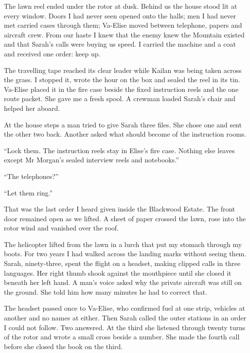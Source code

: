 The lawn reel ended under the rotor at dusk. Behind us the house stood lit at every window. Doors I had never seen opened onto the halls; men I had never met carried cases through them; Va-Elise moved between telephone, papers and aircraft crew. From our haste I knew that the enemy knew the Mountain existed and that Sarah's calls were buying us speed. I carried the machine and a coat and received one order: keep up.\par

The travelling tape reached its clear leader while Kailan was being taken across the grass. I stopped it, wrote the hour on the box and sealed the reel in its tin. Va-Elise placed it in the fire case beside the fixed instruction reels and the one route packet. She gave me a fresh spool. A crewman loaded Sarah's chair and helped her aboard.\par

At the house steps a man tried to give Sarah three files. She chose one and sent the other two back. Another asked what should become of the instruction rooms.\par

``Lock them. The instruction reels stay in Elise's fire case. Nothing else leaves except Mr Morgan's sealed interview reels and notebooks.''\par

``The telephones?''\par

``Let them ring.''\par

That was the last order I heard given inside the Blackwood Estate. The front door remained open as we lifted. A sheet of paper crossed the lawn, rose into the rotor wind and vanished over the roof.\par

The helicopter lifted from the lawn in a lurch that put my stomach through my boots. For two years I had walked across the landing marks without seeing them. Sarah, ninety-three, spent the flight on a headset, making clipped calls in three languages. Her right thumb shook against the mouthpiece until she closed it beneath her left hand. A man's voice asked why the private aircraft was still on the ground. She told him how many minutes he had to correct that.\par

The headset passed once to Va-Elise, who confirmed fuel at one strip, vehicles at another and no names at either. Then Sarah called the outer stations in an order I could not follow. Two answered. At the third she listened through twenty turns of the rotor and wrote a small cross beside a number. She made the fourth call before she closed the book on the third.\par

